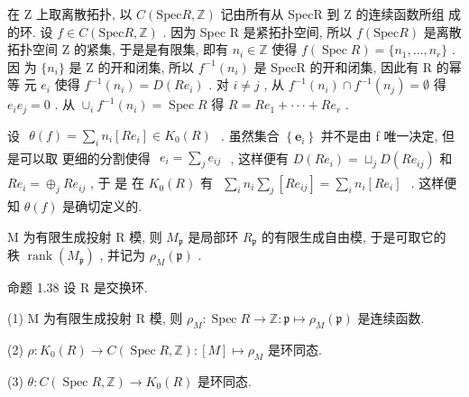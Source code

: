 \documentclass[]{article}
\begin{document}
{在 Z 上取离散拓扑, 以 $C ( { \mathrm { S p e c } } R , \mathbb { Z } )$ 记由所有从 SpecR 到 Z 的连续函数所组 成的环. 设 $f \in C ( { \mathrm { S p e c } } R , \mathbb { Z } )$ . 因为 Spec R 是紧拓扑空间, 所以 $f ( { \mathrm { S p e c } } R )$ 是离散 拓扑空间 Z 的紧集, 于是是有限集, 即有 $n _ { i } \in \mathbb { Z }$ 使得 $f ( \operatorname { S p e c } R ) = \{ n _ { 1 } , \dots , n _ { r } \}$ . 因 为 $\{ n _ { i } \}$ 是 Z 的开和闭集, 所以 $f ^ { - 1 } ( n _ { i } )$ 是 SpecR 的开和闭集, 因此有 R 的幂等 元 $e _ { i }$ 使得 $f ^ { - 1 } ( n _ { i } ) = D ( R e _ { i } )$ . 对 $i \neq j$ , 从 $f ^ { - 1 } ( n _ { i } ) \cap f ^ { - 1 } ( n _ { j } ) = \emptyset$ 得 $e _ { i } e _ { j } = 0$ . 从 $\cup _ { i } f ^ { - 1 } ( n _ { i } ) = \operatorname { S p e c } R$ 得 $R = R e _ { 1 } + \cdot \cdot \cdot + R e _ { r }$ . 

设 $\begin{array} { r } { \theta ( f ) = \sum _ { i } n _ { i } [ R e _ { i } ] \in K _ { 0 } ( R ) } \end{array}$ . 虽然集合 $\left\{ \boldsymbol { e } _ { i } \right\}$ 并不是由 f 唯一决定, 但是可以取 更细的分割使得 $\begin{array} { r } { e _ { i } = \sum _ { j } e _ { i j } } \end{array}$ , 这样便有 $D ( R e _ { i } ) = \sqcup _ { j } D ( R e _ { i j } )$ 和 $R e _ { i } = \oplus _ { j } R e _ { i j }$ , 于 是 在 $K _ { 0 } ( R )$ 有 $\begin{array} { r } { \sum _ { i } n _ { i } \sum _ { j } [ R e _ { i j } ] = \sum _ { i } n _ { i } [ R e _ { i } ] } \end{array}$ . 这样便知 $\theta ( f )$ 是确切定义的. 

M 为有限生成投射 R 模, 则 $M _ { \mathfrak { p } }$ 是局部环 $R _ { \mathfrak { p } }$ 的有限生成自由模, 于是可取它的 秩 $\operatorname { r a n k } ( M _ { \mathfrak { p } } )$ , 并记为 $\rho _ { M } ( \mathfrak { p } )$ . 

命题 1.38 设 R 是交换环. 

(1) M 为有限生成投射 R 模, 则 $\rho _ { M } : \operatorname { S p e c } R \to \mathbb { Z } : { \mathfrak { p } } \mapsto \rho _ { M } ( { \mathfrak { p } } )$ 是连续函数. 

(2) $\rho : K _ { 0 } ( R ) \to C ( \operatorname { S p e c } R , \mathbb { Z } ) : [ M ] \mapsto \rho _ { M }$ 是环同态. 

(3) $\theta : C ( \operatorname { S p e c } R , \mathbb { Z } ) \to K _ { 0 } ( R )$ 是环同态. 

}
\end{document}

